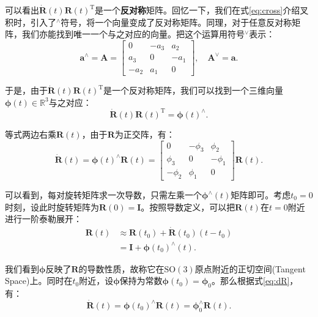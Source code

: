 可以看出$\bm{\dot{R}} (t) \bm{R} {(t)^\mathrm{T}}$是一个\textbf{反对称}矩阵。回忆一下，我们在式\eqref{eq:cross}介绍叉积时，引入了$^\wedge$符号，将一个向量变成了反对称矩阵。同理，对于任意反对称矩阵，我们亦能找到唯一一个与之对应的向量。把这个运算用符号$^{\vee}$表示：
\begin{equation}
{\bm{a}^ \wedge } = \bm{A} = \left[ {\begin{array}{*{20}{c}}
	0&{ - {a_3}}&{{a_2}}\\
	{{a_3}}&0&{ - {a_1}}\\
	{ - {a_2}}&{{a_1}}&0
	\end{array}} \right], \quad 
{ \bm{A}^ \vee } = \bm{a}.
\end{equation}

于是，由于$\bm{\dot{R}} (t) \bm{R} {(t)^\mathrm{T}}$是一个反对称矩阵，我们可以找到一个三维向量$\bm{\phi} (t) \in \mathbb{R}^3$与之对应：
\[
  \bm{ \dot{R} } (t) \bm{R}(t)^\mathrm{T} = \bm{\phi} (t) ^ {\wedge}.
\]

等式两边右乘$\bm{R}(t)$，由于$\bm{R}$为正交阵，有：
\begin{equation}
\label{eq:dR}
  \bm{ \dot{R} } (t)  = \bm{\phi} (t)^{\wedge} \bm{R}(t) = 
 \left[ {\begin{array}{*{20}{c}}
  	0&{ - {\phi _3}}&{{\phi _2}}\\
  	{{\phi _3}}&0&{ - {\phi _1}}\\
  	{ - {\phi _2}}&{{\phi _1}}&0
  	\end{array}} \right] \bm{R} (t).
\end{equation}

可以看到，每对旋转矩阵求一次导数，只需左乘一个$\bm{\phi}^\wedge (t)$矩阵即可。考虑$t_0=0$时刻，设此时旋转矩阵为$\bm{R}(0) = \bm{I}$。按照导数定义，可以把$\bm{R}(t)$在$t=0$附近进行一阶泰勒展开：
\begin{equation}
\begin{aligned}
\bm{R} \left( t \right) & \approx \bm{R} \left( t_0 \right) + \dot {\bm{R}} \left( {{t_0}} \right)\left( {t - {t_0}} \right)\\
&= \bm{I} + \bm{\phi} {\left( {{t_0}} \right)^ \wedge } \left( t \right).
\end{aligned}
\end{equation}

我们看到$\bm{\phi}$反映了$\bm{R}$的导数性质，故称它在$\mathrm{SO}(3)$原点附近的正切空间(Tangent Space)上。同时在$t_0$附近，设$\bm{\phi}$保持为常数$\bm{\phi}(t_0) = \bm{\phi}_0$。那么根据式\eqref{eq:dR}，有：
\[
\bm{ \dot{R} } (t) = \bm{\phi} (t_0) ^ {\wedge} \bm{R}(t) = \bm{\phi}_0^ {\wedge} \bm{R}(t).
\]

